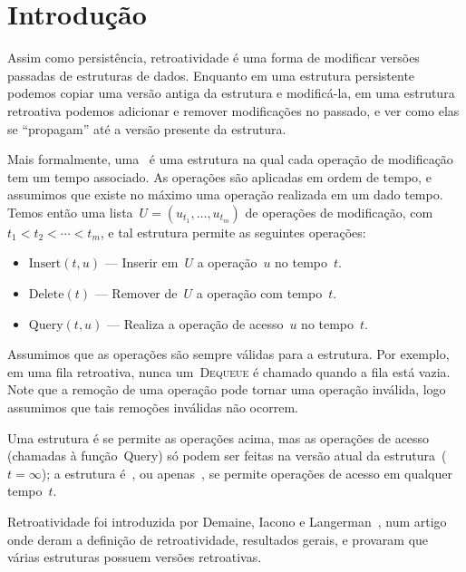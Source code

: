 \documentclass[main.tex]{subfiles}
\begin{document}
\chapter*{Introdução}

Assim como persistência, retroatividade é uma forma de modificar versões passadas de estruturas de dados. Enquanto em uma estrutura persistente podemos copiar uma versão antiga da estrutura e modificá-la, em uma estrutura retroativa podemos adicionar e remover modificações no passado, e ver como elas se ``propagam'' até a versão presente da estrutura.

Mais formalmente, uma~ é uma estrutura na qual cada operação de modificação tem um tempo associado. As operações são aplicadas em ordem de tempo, e assumimos que existe no máximo uma operação realizada em um dado tempo. Temos então uma lista~${U = (u_{t_1}, \ldots, u_{t_m})}$ de operações de modificação, com~${t_1 < t_2 < \cdots < t_m}$, e tal estrutura permite as seguintes operações:

\begin{itemize}
	\item $\text{Insert}(t, u)$ --- Inserir em~$U$ a operação~$u$ no tempo~$t$.
	\item $\text{Delete}(t)$ --- Remover de~$U$ a operação com tempo~$t$.
	\item $\text{Query}(t, u)$ --- Realiza a operação de acesso~$u$ no tempo~$t$.
\end{itemize}

Assumimos que as operações são sempre válidas para a estrutura. Por exemplo, em uma fila retroativa, nunca um~\textsc{Dequeue} é chamado quando a fila está vazia. Note que a remoção de uma operação pode tornar uma operação inválida, logo assumimos que tais remoções inválidas não ocorrem.

Uma estrutura é  se permite as operações acima, mas as operações de acesso (chamadas à função~Query) só podem ser feitas na versão atual da estrutura~(${t = \infty}$); a estrutura é~, ou apenas~, se permite operações de acesso em qualquer tempo~$t$.

Retroatividade foi introduzida por Demaine, Iacono e Langerman~\cite{DemaineIL2007}, num artigo onde deram a definição de retroatividade, resultados gerais, e provaram que várias estruturas possuem versões retroativas.
\end{document}
